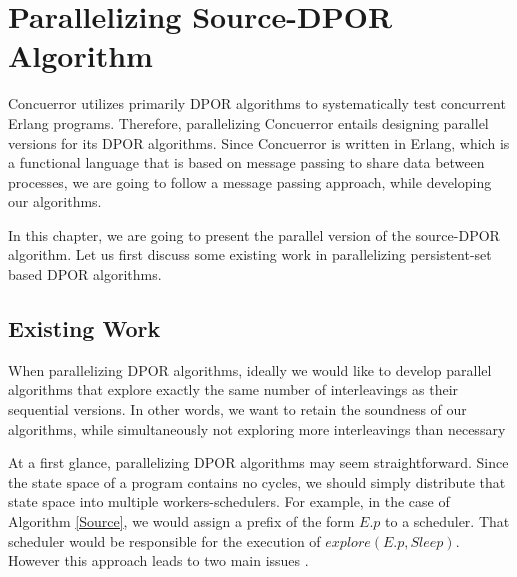 \chapter{Parallelizing Source-DPOR Algorithm}
\label{paradpor}

Concuerror utilizes primarily DPOR algorithms to systematically test concurrent Erlang programs. 
Therefore, parallelizing Concuerror entails designing parallel versions for its DPOR algorithms. 
Since Concuerror is written in Erlang, which is a functional language that is based on message passing to share 
data between processes, we are going to follow a message passing approach, while developing our algorithms.

In this chapter, we are going to present the parallel version of the source-DPOR algorithm. Let us first
discuss some existing work in parallelizing persistent-set based DPOR algorithms.

\section{Existing Work}

When parallelizing DPOR algorithms, ideally we would like to develop parallel algorithms that explore
exactly the same number of interleavings as their sequential versions. In other words, we want to retain
the soundness of our algorithms, while simultaneously not exploring more interleavings than necessary

At a first glance, parallelizing DPOR algorithms may seem straightforward. Since the state space of a program contains no cycles, 
we should simply distribute that state space into multiple workers-schedulers. For example, in the case of Algorithm \ref{Source}, 
we would assign a prefix of the form $E.p$ to a scheduler. That scheduler would be responsible for the execution of $explore(E.p, Sleep)$.
However this approach leads to two main issues \cite{Yang:2007:DDP:1770532.1770541}.

